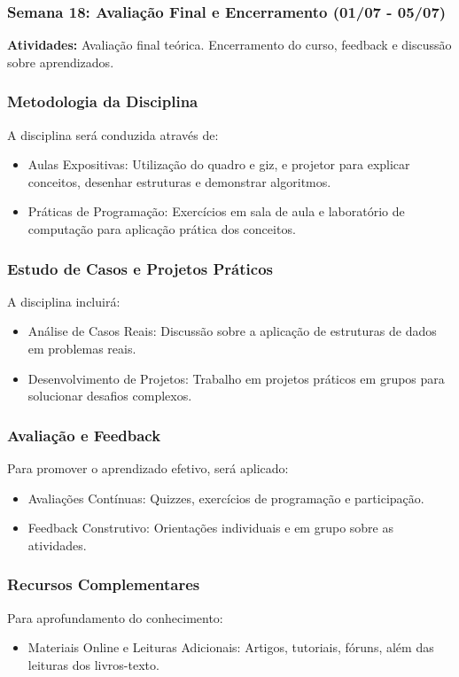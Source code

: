 \begin{frame}
  \frametitle{Semana 18: Avaliação Final e Encerramento (01/07 - 05/07)}
  \textbf{Atividades:} Avaliação final teórica. Encerramento do curso, feedback e discussão sobre aprendizados.
\end{frame}
\begin{frame}
  \frametitle{Metodologia da Disciplina}
  A disciplina será conduzida através de:
  \begin{itemize}
    \item Aulas Expositivas: Utilização do quadro e giz, e projetor para explicar conceitos, desenhar estruturas e demonstrar algoritmos.
    \item Práticas de Programação: Exercícios em sala de aula e laboratório de computação para aplicação prática dos conceitos.
  \end{itemize}
\end{frame}
\begin{frame}
  \frametitle{Estudo de Casos e Projetos Práticos}
  A disciplina incluirá:
  \begin{itemize}
    \item Análise de Casos Reais: Discussão sobre a aplicação de estruturas de dados em problemas reais.
    \item Desenvolvimento de Projetos: Trabalho em projetos práticos em grupos para solucionar desafios complexos.
  \end{itemize}
\end{frame}
\begin{frame}
  \frametitle{Avaliação e Feedback}
  Para promover o aprendizado efetivo, será aplicado:
  \begin{itemize}
    \item Avaliações Contínuas: Quizzes, exercícios de programação e participação.
    \item Feedback Construtivo: Orientações individuais e em grupo sobre as atividades.
  \end{itemize}
\end{frame}
\begin{frame}
  \frametitle{Recursos Complementares}
  Para aprofundamento do conhecimento:
  \begin{itemize}
    \item Materiais Online e Leituras Adicionais: Artigos, tutoriais, fóruns, além das leituras dos livros-texto.
  \end{itemize}
\end{frame}
